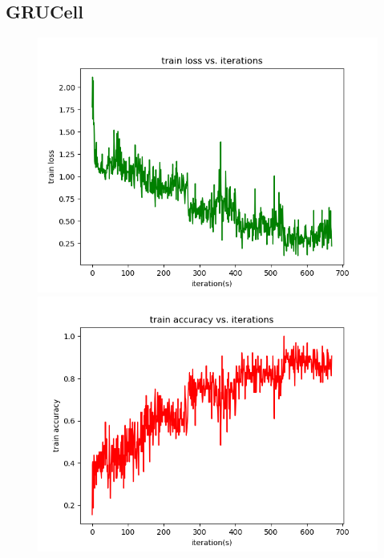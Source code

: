 \documentclass{elegantbook}
\begin{document}

\subsection{GRUCell}
\begin{figure}[!h]
	\centering
	\begin{minipage}[t]{0.48\textwidth}
		\centering
		\includegraphics[width=\textwidth]{../codes/trainlossgrucell}
	\end{minipage}
	\begin{minipage}[t]{0.48\textwidth}
		\centering
		\includegraphics[width=\textwidth]{../codes/trainaccgrucell}

\end{minipage}
\end{figure}
\end{document}
